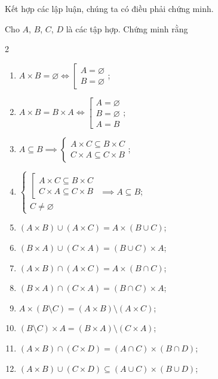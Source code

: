 Kết hợp các lập luận, chúng ta có điều phải chứng minh.

\exercise Cho $A$, $B$, $C$, $D$ là các tập hợp. Chứng minh rằng
\begin{multicols}{2}
   \begin{enumerate}
      \item $A \times B = \varnothing \iff \left[\begin{array}{l}
         A = \varnothing \\
         B = \varnothing
      \end{array}\right.$;
      \item $A \times B = B \times A \iff \left[\begin{array}{l}
         A = \varnothing \\
         B = \varnothing \\
         A = B
      \end{array}\right.$;
      \item $A \subseteq B \implies \begin{cases}
         A \times C \subseteq B \times C \\
         C \times A \subseteq C \times B
      \end{cases}$;
      \item $\begin{cases}
         \left[\begin{array}{l}
            A \times C \subseteq B \times C \\
            C \times A \subseteq C \times B
         \end{array}\right. \\
         C \neq \varnothing
      \end{cases} \implies A \subseteq B$;
      \item $(A \times B) \cup (A \times C) = A \times (B \cup C)$;
      \item $(B \times A) \cup (C \times A) = (B \cup C) \times A$;
      \item $(A \times B) \cap (A \times C) = A \times (B \cap C)$;
      \item $(B \times A) \cap (C \times A) = (B \cap C) \times A$;
      \item $A \times (B \setminus C) = (A \times B) \setminus (A \times C)$;
      \item $(B \setminus C) \times A = (B \times A) \setminus (C \times A)$;
      \item $(A \times B) \cap (C \times D) = (A \cap C) \times (B \cap D)$;
      \item $(A \times B) \cup (C \times D) \subseteq (A \cup C) \times (B \cup D)$;
      \setcounter{subexercise}{\value{enumi}}
   \end{enumerate}
\end{multicols}

